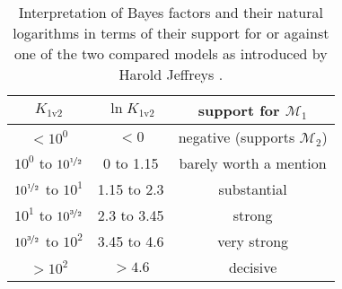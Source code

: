\documentclass[twocolumn]{aastex631}
\begin{document}
\begin{table}
    \centering
    \begin{tabular}{ | c | c | c | }
        \hline
        $K_\text{1v2}$ & $\ln{K_\text{1v2}}$ & support for $\mathcal{M}_1$ \\
        \hline
        $< 10^0$ & $< 0$ & negative (supports $\mathcal{M}_2$) \\
        $10^0$ to $10^{\nicefrac{1}{2}}$ & 0 to 1.15 & barely worth a mention \\
        $10^{\nicefrac{1}{2}}$ to $10^1$ & 1.15 to 2.3 & substantial \\
        $10^1$ to $10^{\nicefrac{3}{2}}$ & 2.3 to 3.45 & strong \\
        $10^{\nicefrac{3}{2}}$ to $10^2$ & 3.45 to 4.6 & very strong \\
        $> 10^2$ & $> 4.6$ & decisive \\
        \hline
    \end{tabular}
    \caption{Interpretation of Bayes factors and their natural logarithms in terms of their support for or against one of the two compared models as introduced by Harold Jeffreys \cite{jeffreys_theory_1998}.}
    \label{table:bayes_factor}
\end{table}
\end{document}
